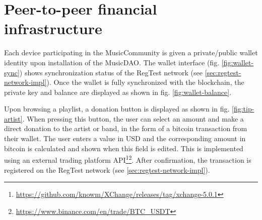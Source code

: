\section{Peer-to-peer financial infrastructure}
Each device participating in the MusicCommunity is given a private/public wallet identity upon installation of the MusicDAO. The wallet interface (fig. \ref{fig:wallet-sync}) shows synchronization status of the RegTest network (see \ref{sec:regtest-network-impl}). Once the wallet is fully synchronized with the blockchain, the private key and balance are displayed as shown in fig. \ref{fig:wallet-balance}. 

Upon browsing a playlist, a donation button is displayed as shown in fig. \ref{fig:tip-artist}. When pressing this button, the user can select an amount and make a direct donation to the artist or band, in the form of a bitcoin transaction from their wallet. The user enters a value in USD and the corresponding amount in bitcoin is calculated and shown when this field is edited. This is implemented using an external trading platform API\footnote{\url{https://github.com/knowm/XChange/releases/tag/xchange-5.0.1}}\footnote{\url{https://www.binance.com/en/trade/BTC_USDT}}. After confirmation, the transaction is registered on the RegTest network (see \ref{sec:regtest-network-impl}). 

